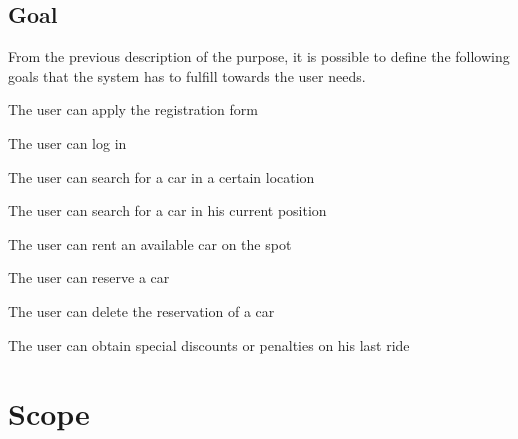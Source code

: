 \documentclass[11pt,a4paper]{report}
\begin{document}
\subsection{Goal}
From the previous description of the purpose, it is possible to define the following goals that the system has to fulfill towards the user needs.
\begin{Goal}
\item The user can apply the registration form
\item The user can log in
\item The user can search for a car in a certain location
\item The user can search for a car in his current position
\item The user can rent an available car on the spot
\item The user can reserve a car
\item The user can delete the reservation of a car
\item The user can obtain special discounts or penalties on his last ride
\end{Goal}

\section{Scope}
\end{document}
